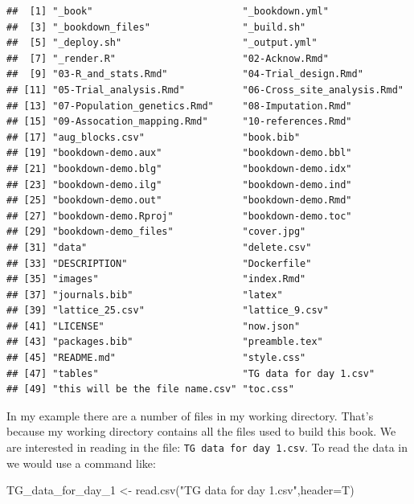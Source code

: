 \documentclass[
]{book}
\newenvironment{Shaded}{\begin{snugshade}}{\end{snugshade}}
\newcommand{\AttributeTok}[1]{\textcolor[rgb]{0.77,0.63,0.00}{#1}}
\newcommand{\FunctionTok}[1]{\textcolor[rgb]{0.00,0.00,0.00}{#1}}
\newcommand{\NormalTok}[1]{#1}
\newcommand{\OtherTok}[1]{\textcolor[rgb]{0.56,0.35,0.01}{#1}}
\newcommand{\StringTok}[1]{\textcolor[rgb]{0.31,0.60,0.02}{#1}}
\begin{document}
\begin{verbatim}
##  [1] "_book"                          "_bookdown.yml"                 
##  [3] "_bookdown_files"                "_build.sh"                     
##  [5] "_deploy.sh"                     "_output.yml"                   
##  [7] "_render.R"                      "02-Acknow.Rmd"                 
##  [9] "03-R_and_stats.Rmd"             "04-Trial_design.Rmd"           
## [11] "05-Trial_analysis.Rmd"          "06-Cross_site_analysis.Rmd"    
## [13] "07-Population_genetics.Rmd"     "08-Imputation.Rmd"             
## [15] "09-Assocation_mapping.Rmd"      "10-references.Rmd"             
## [17] "aug_blocks.csv"                 "book.bib"                      
## [19] "bookdown-demo.aux"              "bookdown-demo.bbl"             
## [21] "bookdown-demo.blg"              "bookdown-demo.idx"             
## [23] "bookdown-demo.ilg"              "bookdown-demo.ind"             
## [25] "bookdown-demo.out"              "bookdown-demo.Rmd"             
## [27] "bookdown-demo.Rproj"            "bookdown-demo.toc"             
## [29] "bookdown-demo_files"            "cover.jpg"                     
## [31] "data"                           "delete.csv"                    
## [33] "DESCRIPTION"                    "Dockerfile"                    
## [35] "images"                         "index.Rmd"                     
## [37] "journals.bib"                   "latex"                         
## [39] "lattice_25.csv"                 "lattice_9.csv"                 
## [41] "LICENSE"                        "now.json"                      
## [43] "packages.bib"                   "preamble.tex"                  
## [45] "README.md"                      "style.css"                     
## [47] "tables"                         "TG data for day 1.csv"         
## [49] "this will be the file name.csv" "toc.css"
\end{verbatim}

In my example there are a number of files in my working directory. That's because my working directory contains all the files used to build this book. We are interested in reading in the file: \texttt{TG\ data\ for\ day\ 1.csv}. To read the data in we would use a command like:

\begin{Shaded}
\begin{Highlighting}[]
\NormalTok{TG\_data\_for\_day\_1 }\OtherTok{\textless{}{-}} \FunctionTok{read.csv}\NormalTok{(}\StringTok{"TG data for day 1.csv"}\NormalTok{,}\AttributeTok{header=}\NormalTok{T)}
\end{Highlighting}
\end{Shaded}
\end{document}
